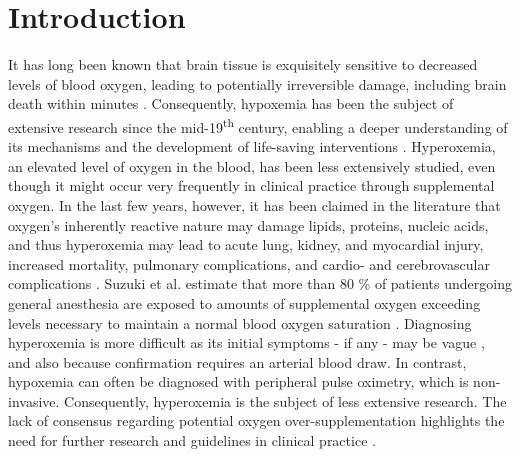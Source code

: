 \documentclass[referee,lineno,pdflatex,sn-nature]{sn-jnl}%
\theoremstyle{thmstyleone}%
\theoremstyle{thmstyletwo}%
\theoremstyle{thmstylethree}%
\begin{document}
\section{Introduction}\label{sec1}

It has long been known that brain tissue is exquisitely sensitive to decreased levels of blood oxygen, leading to potentially irreversible damage, including brain death within minutes \cite{Busl2010}. Consequently, hypoxemia has been the subject of extensive research since the mid-19\textsuperscript{th} century, enabling a deeper understanding of its mechanisms and the development of life-saving interventions \cite{Mach2011}. Hyperoxemia, an elevated level of oxygen in the blood, has been less extensively studied, even though it might occur very frequently in clinical practice through supplemental oxygen. In the last few years, however, it has been claimed in the literature that oxygen’s inherently reactive nature may damage lipids, proteins, nucleic acids, and thus hyperoxemia may lead to acute lung, kidney, and myocardial injury, increased mortality, pulmonary complications, and cardio- and cerebrovascular complications \cite{Mach2011,McIlroy2022,Weenink2020}. Suzuki et al. estimate that more than 80 \% of patients undergoing general anesthesia are exposed to amounts of supplemental oxygen exceeding levels necessary to maintain a normal blood oxygen saturation \cite{McIlroy2022,Suzuki2018}. Diagnosing hyperoxemia is more difficult as its initial symptoms - if any - may be vague \cite{Mach2011,Hafner2015}, and also because confirmation requires an arterial blood draw. In contrast, hypoxemia can often be diagnosed with peripheral pulse oximetry, which is non-invasive. Consequently, hyperoxemia is the subject of less extensive research. The lack of consensus regarding potential oxygen over-supplementation highlights the need for further research and guidelines in clinical practice \cite{Hafner2015,Altemeier2007,Singer2005,Bitterman2009,Calzia2010}. 
\end{document}
